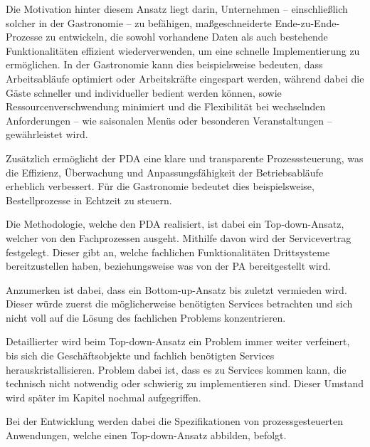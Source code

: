 Die Motivation hinter diesem Ansatz liegt darin, Unternehmen – einschließlich solcher in der Gastronomie – zu befähigen, maßgeschneiderte Ende-zu-Ende-Prozesse zu entwickeln, die sowohl vorhandene Daten als auch bestehende Funktionalitäten effizient wiederverwenden, um eine schnelle Implementierung zu ermöglichen. In der Gastronomie kann dies beispielsweise bedeuten, dass Arbeitsabläufe optimiert oder Arbeitskräfte eingespart werden, während dabei die Gäste schneller und individueller bedient werden können, sowie Ressourcenverschwendung minimiert und die Flexibilität bei wechselnden Anforderungen – wie saisonalen Menüs oder besonderen Veranstaltungen – gewährleistet wird.

Zusätzlich ermöglicht der \ac{PDA} eine klare und transparente Prozesssteuerung, was die Effizienz, Überwachung und Anpassungsfähigkeit der Betriebsabläufe erheblich verbessert. Für die Gastronomie bedeutet dies beispielsweise, Bestellprozesse in Echtzeit zu steuern. \citep[vgl.][]{stiehl_prozessgesteuerte_2024}

Die Methodologie, welche den \ac{PDA} realisiert, ist dabei ein Top-down-Ansatz, welcher von den Fachprozessen ausgeht. Mithilfe davon wird der Servicevertrag festgelegt. Dieser gibt an, welche fachlichen Funktionalitäten Drittsysteme bereitzustellen haben, beziehungsweise was von der \ac{PA} bereitgestellt wird. \citep[vgl.][S. 13]{stiehl_prozessgesteuerte_2013}

Anzumerken ist dabei, dass ein Bottom-up-Ansatz bis zuletzt vermieden wird. Dieser würde zuerst die möglicherweise benötigten Services betrachten und sich nicht voll auf die Lösung des fachlichen Problems konzentrieren. \citep[vgl.][S. 53]{stiehl_prozessgesteuerte_2013}

Detaillierter wird beim Top-down-Ansatz ein Problem immer weiter verfeinert, bis sich die Geschäftsobjekte und fachlich benötigten Services herauskristallisieren. Problem dabei ist, dass es zu Services kommen kann, die technisch nicht notwendig oder schwierig zu implementieren sind.  Dieser Umstand wird später im Kapitel  nochmal aufgegriffen. \citep[vgl.][S. 52ff]{stiehl_prozessgesteuerte_2013}

\label{par:spezifikation_von_prozessgesteuerten_anwendungen}
Bei der Entwicklung werden dabei die Spezifikationen von prozessgesteuerten Anwendungen, welche einen Top-down-Ansatz abbilden, befolgt.

